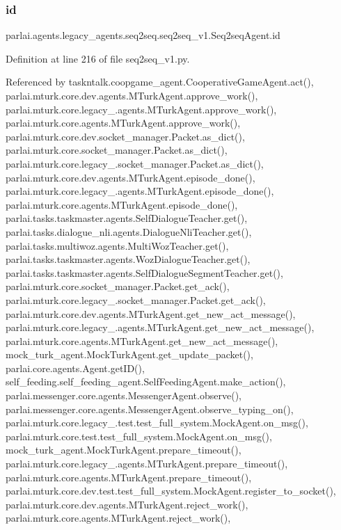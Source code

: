 \subsubsection{\texorpdfstring{id}{id}}
{\footnotesize\ttfamily parlai.\+agents.\+legacy\+\_\+agents.\+seq2seq.\+seq2seq\+\_\+v1.\+Seq2seq\+Agent.\+id}



Definition at line 216 of file seq2seq\+\_\+v1.\+py.



Referenced by taskntalk.\+coopgame\+\_\+agent.\+Cooperative\+Game\+Agent.\+act(), parlai.\+mturk.\+core.\+dev.\+agents.\+M\+Turk\+Agent.\+approve\+\_\+work(), parlai.\+mturk.\+core.\+legacy\+\_.\+agents.\+M\+Turk\+Agent.\+approve\+\_\+work(), parlai.\+mturk.\+core.\+agents.\+M\+Turk\+Agent.\+approve\+\_\+work(), parlai.\+mturk.\+core.\+dev.\+socket\+\_\+manager.\+Packet.\+as\+\_\+dict(), parlai.\+mturk.\+core.\+socket\+\_\+manager.\+Packet.\+as\+\_\+dict(), parlai.\+mturk.\+core.\+legacy\+\_.\+socket\+\_\+manager.\+Packet.\+as\+\_\+dict(), parlai.\+mturk.\+core.\+dev.\+agents.\+M\+Turk\+Agent.\+episode\+\_\+done(), parlai.\+mturk.\+core.\+legacy\+\_.\+agents.\+M\+Turk\+Agent.\+episode\+\_\+done(), parlai.\+mturk.\+core.\+agents.\+M\+Turk\+Agent.\+episode\+\_\+done(), parlai.\+tasks.\+taskmaster.\+agents.\+Self\+Dialogue\+Teacher.\+get(), parlai.\+tasks.\+dialogue\+\_\+nli.\+agents.\+Dialogue\+Nli\+Teacher.\+get(), parlai.\+tasks.\+multiwoz.\+agents.\+Multi\+Woz\+Teacher.\+get(), parlai.\+tasks.\+taskmaster.\+agents.\+Woz\+Dialogue\+Teacher.\+get(), parlai.\+tasks.\+taskmaster.\+agents.\+Self\+Dialogue\+Segment\+Teacher.\+get(), parlai.\+mturk.\+core.\+socket\+\_\+manager.\+Packet.\+get\+\_\+ack(), parlai.\+mturk.\+core.\+legacy\+\_.\+socket\+\_\+manager.\+Packet.\+get\+\_\+ack(), parlai.\+mturk.\+core.\+dev.\+agents.\+M\+Turk\+Agent.\+get\+\_\+new\+\_\+act\+\_\+message(), parlai.\+mturk.\+core.\+legacy\+\_.\+agents.\+M\+Turk\+Agent.\+get\+\_\+new\+\_\+act\+\_\+message(), parlai.\+mturk.\+core.\+agents.\+M\+Turk\+Agent.\+get\+\_\+new\+\_\+act\+\_\+message(), mock\+\_\+turk\+\_\+agent.\+Mock\+Turk\+Agent.\+get\+\_\+update\+\_\+packet(), parlai.\+core.\+agents.\+Agent.\+get\+I\+D(), self\+\_\+feeding.\+self\+\_\+feeding\+\_\+agent.\+Self\+Feeding\+Agent.\+make\+\_\+action(), parlai.\+messenger.\+core.\+agents.\+Messenger\+Agent.\+observe(), parlai.\+messenger.\+core.\+agents.\+Messenger\+Agent.\+observe\+\_\+typing\+\_\+on(), parlai.\+mturk.\+core.\+legacy\+\_.\+test.\+test\+\_\+full\+\_\+system.\+Mock\+Agent.\+on\+\_\+msg(), parlai.\+mturk.\+core.\+test.\+test\+\_\+full\+\_\+system.\+Mock\+Agent.\+on\+\_\+msg(), mock\+\_\+turk\+\_\+agent.\+Mock\+Turk\+Agent.\+prepare\+\_\+timeout(), parlai.\+mturk.\+core.\+legacy\+\_.\+agents.\+M\+Turk\+Agent.\+prepare\+\_\+timeout(), parlai.\+mturk.\+core.\+agents.\+M\+Turk\+Agent.\+prepare\+\_\+timeout(), parlai.\+mturk.\+core.\+dev.\+test.\+test\+\_\+full\+\_\+system.\+Mock\+Agent.\+register\+\_\+to\+\_\+socket(), parlai.\+mturk.\+core.\+dev.\+agents.\+M\+Turk\+Agent.\+reject\+\_\+work(), parlai.\+mturk.\+core.\+agents.\+M\+Turk\+Agent.\+reject\+\_\+work(), 